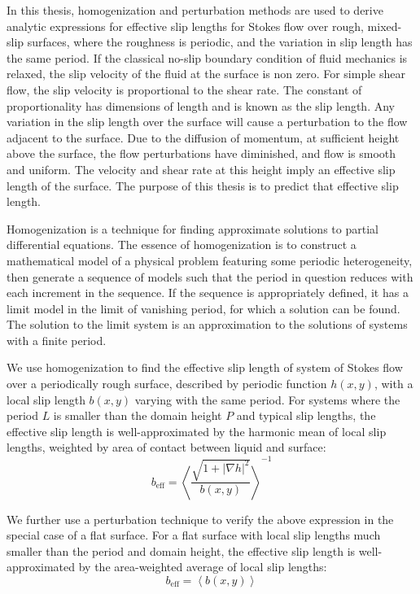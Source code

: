 \documentclass{article}
\newcommand{\beff}{\ensuremath{b_{\mathrm{eff}}}}
\begin{document}
In this thesis, homogenization and perturbation methods are used to derive analytic expressions for effective slip lengths for Stokes flow over rough, mixed-slip surfaces, where the roughness is periodic, and the variation in slip length has the same period.
If the classical no-slip boundary condition of fluid mechanics is relaxed, the slip velocity of the fluid at the surface is non zero.  For simple shear flow, the slip velocity is proportional to the shear rate.  The constant of proportionality has dimensions of length and is known as the slip length.  Any variation in the slip length over the surface will cause a perturbation to the flow adjacent to the surface. Due to the diffusion of momentum, at sufficient height above the surface, the flow perturbations have diminished, and flow is smooth and uniform.  The velocity and shear rate at this height imply an effective slip length of the surface.  The purpose of this thesis is to predict that effective slip length.

Homogenization is a technique for finding approximate solutions to partial differential equations.  The essence of homogenization is to construct a mathematical model of a physical problem featuring some periodic heterogeneity, then generate a sequence of models such that the period in question reduces with each increment in the sequence.  If the sequence is appropriately defined, it has a limit model in the limit of vanishing period, for which a solution can be found.  The solution to the limit system is an approximation to the solutions of systems with a finite period.

We use homogenization to find the effective slip length of system of Stokes flow over a periodically rough surface, described by periodic function $h(x,y)$, with a local slip length $b(x,y)$ varying with the same period.  For systems where the period $L$ is smaller than the domain height $P$ and typical slip lengths, the effective slip length is well-approximated by the harmonic mean of local slip lengths, weighted by area of contact between liquid and surface:
\begin{equation}
\beff = \left<  \frac{ \sqrt{1 + |\nabla h|^2} }{b(x,y)} \right>^{-1}
\end{equation}

We further use a perturbation technique to verify the above expression in the special case of a flat surface.  For a flat surface with local slip lengths much smaller than the period and domain height, the effective slip length is well-approximated by the area-weighted average of local slip lengths:
\begin{equation}
\beff = \left< b(x,y) \right>
\end{equation}
\end{document}
